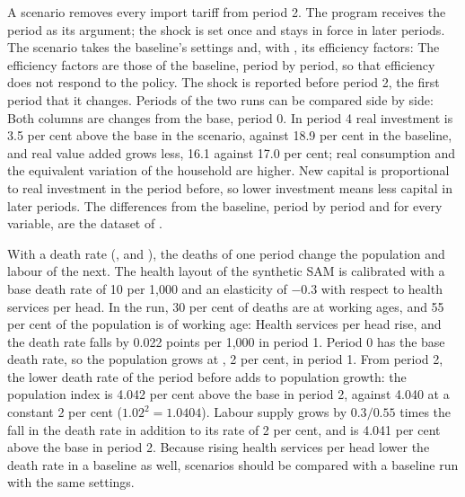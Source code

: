 
A scenario removes every import tariff from period 2. The program
 receives the period as its argument; the shock is set once
and stays in force in later periods. The scenario takes the baseline's
settings and, with , its efficiency factors:
The efficiency factors are those of the baseline, period by period, so that
efficiency does not respond to the policy. The shock is reported before
period 2, the first period that it changes. Periods of the two runs can be
compared side by side:
Both columns are changes from the base, period 0. In period 4 real investment
is 3.5 per cent above the base in the scenario, against 18.9 per cent in the
baseline, and real value added grows less, 16.1 against 17.0 per cent; real
consumption and the equivalent variation of the household are higher. New
capital is proportional to real investment in the period before, so lower
investment means less capital in later periods. The differences
from the baseline, period by period and for every variable, are the dataset
of .


With a death rate (,  and
), the deaths of one period change the population and labour
of the next. The health layout of the synthetic SAM is calibrated with a base
death rate of 10 per 1,000 and an elasticity of $-0.3$ with respect to health
services per head. In the run, 30 per cent of deaths are at working ages, and
55 per cent of the population is of working age:
Health services per head rise, and the death rate falls by 0.022 points per
1,000 in period 1. Period 0 has the base death rate, so the population grows
at , 2 per cent, in period 1. From period 2, the lower death
rate of the period before adds to population growth: the population index is
4.042 per cent above the base in period 2, against 4.040 at a constant 2 per
cent ($1.02^2 = 1.0404$). Labour supply grows by $0.3/0.55$ times the fall in
the death rate in addition to its rate of 2 per cent, and is 4.041 per cent
above the base in period 2. Because rising health services per head lower the
death rate in a baseline as well, scenarios should be compared with a
baseline run with the same settings.

